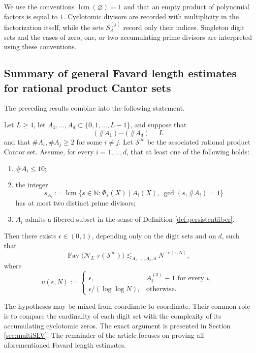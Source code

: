 \documentclass[12pt]{amsart}
\numberwithin{equation}{section}
\DeclareMathOperator{\Fav}{Fav}
\DeclareMathOperator{\lcm}{lcm}
\begin{document}
We use the conventions $\operatorname{lcm}(\varnothing)=1$ and that an empty product of polynomial factors is equal to $1$.  Cyclotomic divisors are recorded with multiplicity in the factorization itself, while the sets $S_A^{(j)}$ record only their indices.  Singleton digit sets and the cases of zero, one, or two accumulating prime divisors are interpreted using these conventions.

\subsection{Summary of general Favard length estimates for rational product Cantor sets}\label{subsec:summaryresults}

The preceding results combine into the following statement.

\begin{theorem}\label{thm:totalFavbound}
Let $L\geq4$, let $A_1,\ldots,A_d\subset\{0,1,\ldots,L-1\}$, and suppose that
\[
(\#A_1)\cdots(\#A_d)=L
\]
and that $\#A_i,\#A_j\geq2$ for some $i\neq j$.  Let $\mathcal{S}^\infty$ be the associated rational product Cantor set.  Assume, for every $i=1,\ldots,d$, that at least one of the following holds:
\begin{enumerate}[(1)]
\item $\#A_i\leq10$;
\item the integer
\[
s_{A_i}:=\lcm\{s\in\mathbb{N}:\Phi_s(X)\mid A_i(X),\ \gcd(s,\#A_i)=1\}
\]
has at most two distinct prime divisors;
\item $A_i$ admits a fibered subset in the sense of Definition \ref{def:persistentfiber}.
\end{enumerate}
Then there exists $\epsilon\in(0,1)$, depending only on the digit sets and on $d$, such that
\[
\Fav\big(\mathcal{N}_{L^{-N}}(\mathcal{S}^\infty)\big)
\lesssim_{A_1,\ldots,A_d,d} N^{-\upsilon(\epsilon,N)},
\]
where
\[
\upsilon(\epsilon,N):=
\begin{cases}
\epsilon, & A_i^{(3)}\equiv1\text{ for every }i,\\[1ex]
\epsilon/(\log\log N), & \text{otherwise}.
\end{cases}
\]
\end{theorem}

The hypotheses may be mixed from coordinate to coordinate.  Their common role is to compare the cardinality of each digit set with the complexity of its accumulating cyclotomic zeros. The exact argument is presented in Section \ref{sec:multiSLV}. The remainder of the article focuses on proving all aforementioned Favard length estimates.
\end{document}
